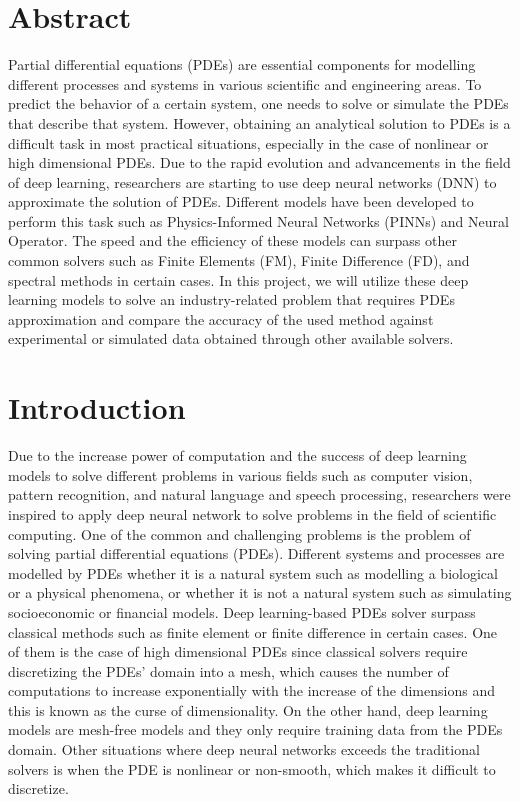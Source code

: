 \documentclass[a4paper, onecolumn, 12pt]{article}
\begin{document}

\onehalfspacing %
\section*{Abstract}
Partial differential equations (PDEs) are essential components for modelling different processes and systems in various scientific and engineering areas. To predict the behavior of a certain system, one needs to solve or simulate the PDEs that describe that system. However, obtaining an analytical solution to PDEs is a difficult task in most practical situations, especially in the case of nonlinear or high dimensional PDEs. Due to the rapid evolution and advancements in the field of deep learning, researchers are starting to use deep neural networks (DNN) to approximate the solution of PDEs. Different models have been developed to perform this task such as Physics-Informed Neural Networks (PINNs) and Neural Operator. The speed and the efficiency of these models can surpass other common solvers such as Finite Elements (FM), Finite Difference (FD), and spectral methods in certain cases. In this project, we will utilize these deep learning models to solve an industry-related problem that requires PDEs approximation and compare the accuracy of the used method against experimental or simulated data obtained through other available solvers.

\section*{Introduction}
Due to the increase power of computation and the success of deep learning models to 
solve different problems in various fields such
as computer vision, pattern recognition, and natural language and speech processing, 
researchers were inspired to apply deep neural network to solve problems in the field of scientific computing. 
One of the common and challenging problems is the problem of solving partial differential equations (PDEs). Different systems and processes are modelled by PDEs whether it is a natural system such as modelling a biological or a physical phenomena, or whether it is not a natural system such as simulating socioeconomic or financial models. Deep learning-based PDEs solver surpass classical methods such as finite element or finite difference in certain cases. One of them is the case of high dimensional PDEs since classical solvers require discretizing the PDEs' domain into a mesh, which causes the number of computations to increase exponentially with the increase of the dimensions and this is known as the curse of dimensionality. On the other hand, deep learning models are mesh-free models and they only require training data from the PDEs domain. 
Other situations where deep neural networks exceeds the traditional solvers is when the PDE is nonlinear or non-smooth, which makes it difficult to discretize. 
\end{document}
